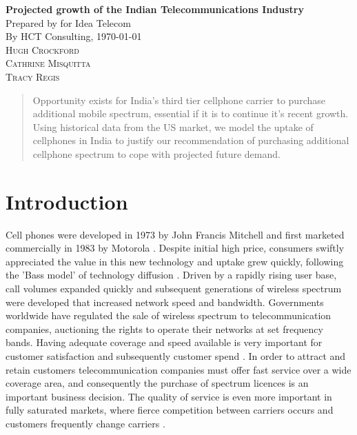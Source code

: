 \documentclass[11pt]{article}
\begin{document}
\begin{flushleft}
	\vspace*{0.3in}
	\Huge \textbf{Projected growth of the Indian Telecommunications Industry} \\
	\vspace{0.25in}
	\Large Prepared by for Idea Telecom\\
	\vspace{0.25in}
	\Large By HCT Consulting, \today \\
	\vspace{0.25in}
	\textsc{Hugh Crockford\\Cathrine Misquitta\\Tracy Regis}
\end{flushleft}
	\vspace{0.75in}
	\renewcommand{\abstractname}{Executive Summary}
	\begin{abstract}
		Opportunity exists for India's third tier cellphone carrier to purchase additional mobile spectrum, essential if it is to continue it's recent growth.
		Using historical data from the US market, we model the uptake of cellphones in India to justify our recommendation of purchasing additional cellphone spectrum to cope with projected future demand.
	\end{abstract}

\newpage
	
	\tableofcontents

\newpage
\section{Introduction}
	Cell phones were developed in 1973 by John Francis Mitchell and first marketed commercially in 1983 by Motorola \cite{Brophy2012}.
	Despite initial high price, consumers swiftly appreciated the value in this new technology and uptake grew quickly, following the 'Bass model' of technology diffusion \cite{Bass1969}.
	Driven by a rapidly rising user base, call volumes expanded quickly and subsequent generations of wireless spectrum were developed that increased network speed and bandwidth.
	Governments worldwide have regulated the sale of wireless spectrum to telecommunication companies, auctioning the rights to operate their networks at set frequency bands.
	Having adequate coverage and speed available is very important for customer satisfaction and subsequently customer spend \cite{J.D.Powera}. 
	In order to attract and retain customers telecommunication companies must offer fast service over a wide coverage area, and consequently the purchase of spectrum licences is an important business decision.
	The quality of service is even more important in fully saturated markets, where fierce competition between carriers occurs and customers frequently change carriers \cite{ditching13}.
\end{document}
